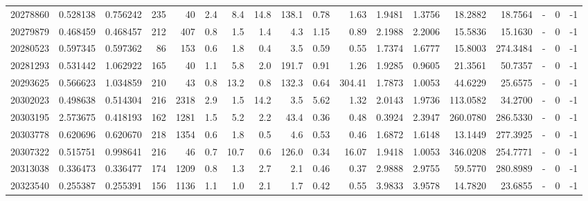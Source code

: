 \begin{tabular}{rrrrrrrrrrrrrrrlrr}
  20278860 & 0.528138 &   0.756242 &  235 &   40 &      2.4 &      8.4 &    14.8 &    138.1 &       0.78 &        1.63 &  1.9481 &  1.3756 &   18.2882 &   18.7564 &             - &        0 &         -1 \\
  20279879 & 0.468459 &   0.468457 &  212 &  407 &      0.8 &      1.5 &     1.4 &      4.3 &       1.15 &        0.89 &  2.1988 &  2.2006 &   15.5836 &   15.1630 &             - &        0 &         -1 \\
  20280523 & 0.597345 &   0.597362 &   86 &  153 &      0.6 &      1.8 &     0.4 &      3.5 &       0.59 &        0.55 &  1.7374 &  1.6777 &   15.8003 &  274.3484 &             - &        0 &         -1 \\
  20281293 & 0.531442 &   1.062922 &  165 &   40 &      1.1 &      5.8 &     2.0 &    191.7 &       0.91 &        1.26 &  1.9285 &  0.9605 &   21.3561 &   50.7357 &             - &        0 &         -1 \\
  20293625 & 0.566623 &   1.034859 &  210 &   43 &      0.8 &     13.2 &     0.8 &    132.3 &       0.64 &      304.41 &  1.7873 &  1.0053 &   44.6229 &   25.6575 &             - &        0 &         -1 \\
  20302023 & 0.498638 &   0.514304 &  216 & 2318 &      2.9 &      1.5 &    14.2 &      3.5 &       5.62 &        1.32 &  2.0143 &  1.9736 &  113.0582 &   34.2700 &             - &        0 &         -1 \\
  20303195 & 2.573675 &   0.418193 &  162 & 1281 &      1.5 &      5.2 &     2.2 &     43.4 &       0.36 &        0.48 &  0.3924 &  2.3947 &  260.0780 &  286.5330 &             - &        0 &         -1 \\
  20303778 & 0.620696 &   0.620670 &  218 & 1354 &      0.6 &      1.8 &     0.5 &      4.6 &       0.53 &        0.46 &  1.6872 &  1.6148 &   13.1449 &  277.3925 &             - &        0 &         -1 \\
  20307322 & 0.515751 &   0.998641 &  216 &   46 &      0.7 &     10.7 &     0.6 &    126.0 &       0.34 &       16.07 &  1.9418 &  1.0053 &  346.0208 &  254.7771 &             - &        0 &         -1 \\
  20313038 & 0.336473 &   0.336477 &  174 & 1209 &      0.8 &      1.3 &     2.7 &      2.1 &       0.46 &        0.37 &  2.9888 &  2.9755 &   59.5770 &  280.8989 &             - &        0 &         -1 \\
  20323540 & 0.255387 &   0.255391 &  156 & 1136 &      1.1 &      1.0 &     2.1 &      1.7 &       0.42 &        0.55 &  3.9833 &  3.9578 &   14.7820 &   23.6855 &             - &        0 &         -1 \\

\end{tabular}
